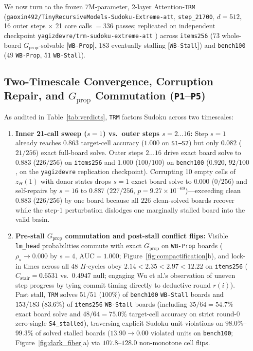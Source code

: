 \documentclass[10pt,letterpaper]{article}
\newcommand{\Gprop}{G_{\mathrm{prop}}}
\begin{document}
We now turn to the frozen 7M-parameter, 2-layer Attention-\texttt{TRM} (\texttt{gaoxin492/\allowbreak TinyRecursiveModels-\allowbreak Sudoku-\allowbreak Extreme-\allowbreak att}, \texttt{step\_21700}, $d=512$, 16 outer steps $\times$ 21 core calls $= 336$ passes; replicated on independent checkpoint \texttt{yagizdevre/\allowbreak trm-\allowbreak sudoku-\allowbreak extreme-\allowbreak att} \cite{jolicoeur2025trm}) across \texttt{items256} ($73$ whole-board $\Gprop$-solvable [\texttt{WB-Prop}], $183$ eventually stalling [\texttt{WB-Stall}]) and \texttt{bench100} ($49$ \texttt{WB-Prop}, $51$ \texttt{WB-Stall}).

\subsection{Two-Timescale Convergence, Corruption Repair, and \texorpdfstring{$\Gprop$}{G\_prop} Commutation (\texttt{P1}--\texttt{P5})}

As audited in Table~\ref{tab:verdicts}, \texttt{TRM} factors Sudoku across two timescales:
\begin{enumerate}[topsep=3pt,itemsep=2pt]
  \item \textbf{Inner 21-call sweep ($s=1$) vs.\ outer steps $s=2\dots 16$:} Step $s=1$ already reaches $0.863$ target-cell accuracy ($1.000$ on \texttt{S1--S2}) but only $0.082$ ($21/256$) exact full-board solve. Outer steps $2\dots 16$ drive exact board solve to $\mathbf{0.883}$ ($226/256$) on \texttt{items256} and $\mathbf{1.000}$ ($100/100$) on \texttt{bench100} ($\mathbf{0.920}$, $92/100$, on the \texttt{yagizdevre} replication checkpoint). Corrupting 10 empty cells of $z_H(1)$ with donor states drops $s=1$ exact board solve to $0.000$ ($0/256$) and self-repairs by $s=16$ to $\mathbf{0.887}$ ($227/256$, $p=9.27\times 10^{-69}$)—exceeding clean $0.883$ ($226/256$) by one board because all $226$ clean-solved boards recover while the step-1 perturbation dislodges one marginally stalled board into the valid basin.
  \item \textbf{Pre-stall $\Gprop$ commutation and post-stall conflict flips:} Visible \texttt{lm\_head} probabilities commute with exact $\Gprop$ on \texttt{WB-Prop} boards ($\rho_s \to 0.000$ by $s=4$, $\mathrm{AUC}=1.000$; Figure~\ref{fig:compactification}b), and lock-in times across all 48 $H$-cycles obey $2.14 < 2.35 < 2.97 < 12.22$ on \texttt{items256} ($C_{\mathrm{stair}}=0.6531$ vs.\ $0.4947$ null; engaging Wu et al.'s \cite{wu2026shared} observation of uneven step progress by tying commit timing directly to deductive round $r(i)$). Past stall, \texttt{TRM} solves $51/51$ ($100\%$) of \texttt{bench100} \texttt{WB-Stall} boards and $153/183$ ($83.6\%$) of \texttt{items256} \texttt{WB-Stall} boards (including $35/64 = 54.7\%$ exact board solve and $48/64 = 75.0\%$ target-cell accuracy on strict round-0 zero-single \texttt{S4\_stalled}), traversing explicit Sudoku unit violations on $98.0\%$--$99.3\%$ of solved stalled boards ($13.90 \to 0.00$ violated units on \texttt{bench100}; Figure~\ref{fig:dark_fiber}a) via $107.8$--$128.0$ non-monotone cell flips.
\end{enumerate}
\end{document}
